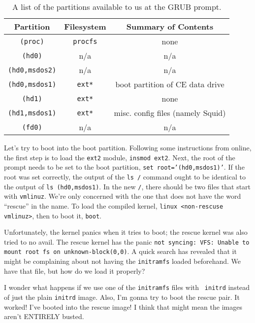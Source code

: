 \documentclass[12pt]{article}
\begin{document}
\begin{table}[H]
  \label{tab:grubPartitions}
  \caption{A list of the partitions available to us at the GRUB prompt.}
  \begin{center}
    \begin{tabular}{|c|c|c|}
      \hline
      Partition & Filesystem & Summary of Contents \\
      \hline
      {\tt (proc)} & {\tt procfs} & none \\
      {\tt (hd0)} & n/a & n/a \\
      {\tt (hd0,msdos2)} & n/a & n/a \\
      {\tt (hd0,msdos1)} & {\tt ext*} & boot partition of CE data drive \\
      {\tt (hd1)} & {\tt ext*} & none \\
      {\tt (hd1,msdos1)} & {\tt ext*} & misc. config files (namely Squid) \\
      {\tt (fd0)} & n/a & n/a \\
      \hline
    \end{tabular}
  \end{center}
\end{table}

\qq Let's try to boot into the boot partition. Following some instructions from
online, the first step is to load the {\tt ext2} module, {\tt insmod
  ext2}. Next, the root of the prompt needs to be set to the boot partition,
{\tt set root='(hd0,msdos1)'}. If the root was set correctly, the output of the
{\tt ls /} command ought to be identical to the output of {\tt ls
  (hd0,msdos1)}. In the new {\tt /}, there should be two files that start with
{\tt vmlinuz}. We're only concerned with the one that does not have the word
``rescue'' in the name. To load the compiled kernel, {\tt linux <non-rescuse
  vmlinuz>}, then to boot it, {\tt boot}.

\qq Unfortunately, the kernel panics when it tries to boot; the rescue
kernel was also tried to no avail. The rescue kernel has the panic {\tt not
syncing: VFS: Unable to mount root fs on unknown-block(0,0)}. A quick search has
revealed that it might be complaining about not having the {\tt initramfs}
loaded beforehand. We have that file, but how do we load it properly?

\qq I wonder what happens if we use one of the {\tt initramfs} files with {\tt
  initrd} instead of just the plain {\tt initrd} image. Also, I'm gonna try to
boot the rescue pair. It worked! I've booted into the rescue image! I think that
might mean the images aren't ENTIRELY busted.
\end{document}
